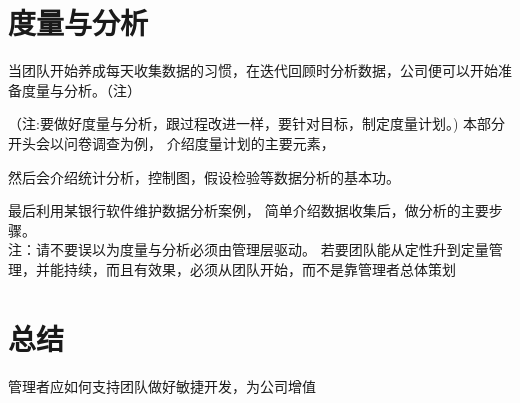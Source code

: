 \documentclass{book}        %
\begin{document}



\part{度量与分析}当团队开始养成每天收集数据的习惯，在迭代回顾时分析数据，公司便可以开始准备度量与分析。（注）


（注:要做好度量与分析，跟过程改进一样，要针对目标，制定度量计划。)
本部分开头会以问卷调查为例，
介绍度量计划的主要元素，

然后会介绍统计分析，控制图，假设检验等数据分析的基本功。

最后利用某银行软件维护数据分析案例，
简单介绍数据收集后，做分析的主要步骤。\\


注：请不要误以为度量与分析必须由管理层驱动。
若要团队能从定性升到定量管理，并能持续，而且有效果，必须从团队开始，而不是靠管理者总体策划
\\



\part{总结} 管理者应如何支持团队做好敏捷开发，为公司增值\\


\end{document}
